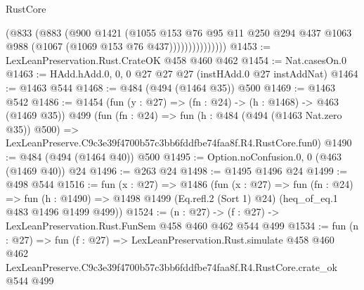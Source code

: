 \begin{lexlean}{RustCore}
\begin{coremodule}
                      (@833
                        (@883
                          (@900
                            @1421
                            (@1055
                              @153
                              @76
                              @95
                              @11
                              @250
                              @294
                              @437
                              @1063
                              @988
                              (@1067 (@1069 @153 @76 @437)))))))))))))))
@1453 := LexLeanPreservation.Rust.CrateOK @458 @460 @462
@1454 := Nat.casesOn.{0}
@1463 := HAdd.hAdd.{0, 0, 0} @27 @27 @27 (instHAdd.{0} @27 instAddNat)
@1464 := @1463 @544
@1468 := @484 (@494 (@1464 @35)) @500
@1469 := @1463 @542
@1486 := @1454
    (fun (y : @27) => (fn : @24) -> (h : @1468) -> @463 (@1469 @35))
    @499
    (fun (fn : @24) =>
    fun (h : @484 (@494 (@1463 Nat.zero @35)) @500) =>
    LexLeanPreserve.C9c3e39f4700b57c3bb6fddfbe74faa8f.R4.RustCore.fun0)
@1490 := @484 (@494 (@1464 @40)) @500
@1495 := Option.noConfusion.{0, 0} (@463 (@1469 @40)) @24
@1496 := @263 @24
@1498 := @1495 @1496 @24
@1499 := @498 @544
@1516 := fun (x : @27) =>
  @1486
    (fun (x : @27) =>
    fun (fn : @24) =>
    fun (h : @1490) => @1498 @1499 (Eq.refl.{2} (Sort 1) @24) (heq_of_eq.{1} @483 @1496 @1499 @499))
@1524 := (n : @27) -> (f : @27) -> LexLeanPreservation.Rust.FunSem @458 @460 @462 @544 @499
@1534 := fun (n : @27) =>
  fun (f : @27) =>
  LexLeanPreservation.Rust.simulate
    @458
    @460
    @462
    LexLeanPreserve.C9c3e39f4700b57c3bb6fddfbe74faa8f.R4.RustCore.crate_ok
    @544
    @499
\end{coremodule}
\end{lexlean}
